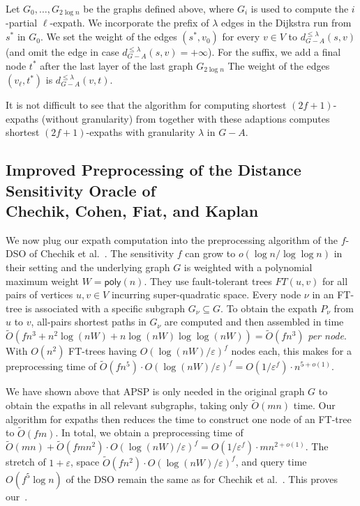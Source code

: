 \documentclass{article}\usepackage[a4paper,margin=20mm]{geometry}
\newcommand*{\Otilde}{\widetilde{O}}
\newcommand*{\poly}{\textsf{poly}}
\renewcommand{\le}{\leqslant}
\begin{document}
Let $G_0, \ldots, G_{2 \log n}$ be the graphs defined above,
where $G_i$ is used to compute the $i$-partial \mbox{$\ell$-expath}.
We incorporate the prefix of $\lambda$ edges in the Dijkstra run from $s^*$ in $G_0$.
We set the weight of the edges $(s^*, v_{0})$ for every $v \in V$ to $d_{G-A}^{\le \lambda}(s,v)$
(and omit the edge in case $d_{G-A}^{\le \lambda}(s,v) = +\infty$).
For the suffix, we add a final node $t^*$ after the last layer of the last graph $G_{2\log n}$
The weight of the edges $(v_{\ell}, t^*)$ is $d_{G-A}^{\le \lambda}(v, t)$.

It is not difficult to see that the algorithm for computing shortest $(2f{+}1)$-expaths 
(without granularity) from  together with these adaptions computes shortest \mbox{$(2f{+}1)$-expaths} with granularity $\lambda$ in $G{-}A$.


\subsection{Improved Preprocessing of the Distance Sensitivity Oracle of \texorpdfstring{\\}{} Chechik, Cohen, Fiat, and Kaplan}
\label{subsec:improved_preproc_DSO}

We now plug our expath computation into the preprocessing algorithm
of the $f$-DSO of Chechik et al.~\cite{ChCoFiKa17}.
The sensitivity $f$ can grow to $o(\log n/\log\log n)$ in their setting
and the underlying graph $G$ is weighted with a polynomial maximum weight $W = \poly(n)$.
They use fault-tolerant trees $FT(u,v)$ for all pairs of vertices $u,v \in V$
incurring super-quadratic space.
Every node $\nu$ in an FT-tree is associated with a specific subgraph $G_\nu \subseteq G$.
To obtain the expath $P_{\nu}$ from $u$ to $v$,
all-pairs shortest paths in $G_\nu$ are computed
and then assembled in time
$\Otilde(fn^3 + n^2\log (nW) + n \log (nW) \log \log (nW)) = \Otilde(fn^3)$ \emph{per node}.
With $O(n^2)$ FT-trees having $O(\log(nW)/\varepsilon)^f$ nodes each,
this makes for a preprocessing time of
$\Otilde(fn^5) \cdot O(\log(nW)/\varepsilon)^f
  = O(1/\varepsilon^f)  \cdot n^{5+o(1)}$.

We have shown above that APSP is only needed in the original graph $G$ to obtain 
the expaths in all relevant subgraphs,
taking only $\Otilde(mn)$ time.
Our algorithm for expaths then reduces the time to construct one node of an FT-tree to $\Otilde(fm)$.
In total, we obtain a preprocessing time of 
$\Otilde(mn) + \Otilde(fmn^2) \cdot O(\log(nW)/\varepsilon)^f 
	= O(1/\varepsilon^f)  \cdot mn^{2+o(1)}$.
The stretch of $1+\varepsilon$, space $\Otilde(fn^2) \cdot O(\log(nW)/\varepsilon)^f$,
and query time $O(f^5 \log n)$ of the DSO remain the same as for Chechik et al.~\cite[Theorem~3.2]{ChCoFiKa17}.
This proves our~.


 

\end{document}
